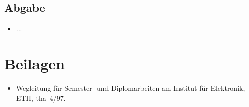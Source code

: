  \subsection*{Abgabe}
 \begin{itemize}
   \item
    ... 
 \end{itemize}
  

 \section*{Beilagen}
 \begin{itemize}
   \item
   Wegleitung f\"ur Semester- und Diplomarbeiten am Institut f\"ur Elektronik, ETH, \mbox{tha 4/97}.
 \end{itemize}

\dateandsignature
